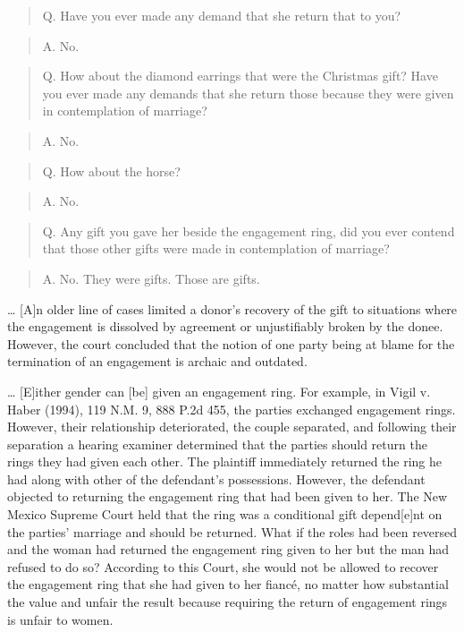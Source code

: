 \begin{quote}
Q. Have you ever made any demand that she return that to you?
\end{quote}

\begin{quote}
A. No.
\end{quote}

\begin{quote}
Q. How about the diamond earrings that were the Christmas gift? Have you ever
made any demands that she return those because they were given in contemplation
of marriage?
\end{quote}

\begin{quote}
A. No.
\end{quote}

\begin{quote}
Q. How about the horse?
\end{quote}

\begin{quote}
A. No.
\end{quote}

\begin{quote}
Q. Any gift you gave her beside the engagement ring, did you ever contend that
those other gifts were made in contemplation of marriage?
\end{quote}

\begin{quote}
A. No. They were gifts. Those are gifts.
\end{quote}

\dots{} [A]n older line of cases limited a donor's recovery of the gift to
situations where the engagement is dissolved by agreement or unjustifiably
broken by the donee. However, the court concluded that the notion of one party
being at blame for the termination of an engagement is archaic and outdated. 

\dots{} [E]ither gender can [be] given an engagement ring. For example, in Vigil
v. Haber (1994), 119 N.M. 9, 888 P.2d 455, the parties exchanged engagement
rings. However, their relationship deteriorated, the couple separated, and
following their separation a hearing examiner determined that the parties
should return the rings they had given each other. The plaintiff immediately
returned the ring he had along with other of the defendant's possessions.
However, the defendant objected to returning the engagement ring that had been
given to her. The New Mexico Supreme Court held that the ring was a conditional
gift depend[e]nt on the parties' marriage and should be returned. What if the
roles had been reversed and the woman had returned the engagement ring given to
her but the man had refused to do so? According to this Court, she would not be
allowed to recover the engagement ring that she had given to her fianc\'e, no
matter how substantial the value and unfair the result because requiring the
return of engagement rings is unfair to women.

